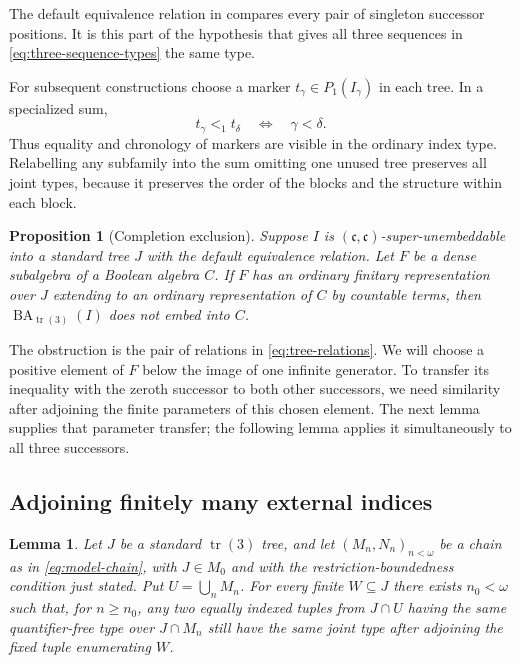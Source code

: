 \documentclass[11pt]{article}
\newtheorem{proposition}[theorem]{Proposition}
\newtheorem{lemma}[theorem]{Lemma}
\theoremstyle{definition}
\theoremstyle{remark}
\newcommand{\BA}{\operatorname{BA}_{\operatorname{tr}(3)}}
\newcommand{\cc}{\mathfrak c}
\newcommand{\tr}{\operatorname{tr}}
\begin{document}
The default equivalence relation in
\cite[Definition~1.4(3)]{Shelah2023} compares every pair of singleton
successor positions.  It is this part of the hypothesis that gives all
three sequences in \eqref{eq:three-sequence-types} the same type.

For subsequent constructions choose a marker
$t_\gamma\in P_1(I_\gamma)$ in each tree.  In a specialized sum,
\begin{equation}\label{eq:marker-order}
 t_\gamma<_1t_\delta\quad\Longleftrightarrow\quad\gamma<\delta.
\end{equation}
Thus equality and chronology of markers are visible in the ordinary index
type.  Relabelling any subfamily into the sum omitting one unused tree
preserves all joint types, because it preserves the order of the blocks
and the structure within each block.

\begin{proposition}[Completion exclusion]\label{prop:exclusion}
Suppose $I$ is $(\cc,\cc)$-super-unembeddable into a standard tree $J$
with the default equivalence relation.  Let $F$ be a dense subalgebra of a
Boolean algebra $C$.  If $F$ has an ordinary finitary representation over
$J$ extending to an ordinary representation of $C$ by countable terms,
then $\BA(I)$ does not embed into $C$.
\end{proposition}

The obstruction is the pair of relations in \eqref{eq:tree-relations}.
We will choose a positive element of $F$ below the image of one infinite
generator.  To transfer its inequality with the zeroth successor to both
other successors, we need similarity after adjoining the finite parameters
of this chosen element.  The next lemma supplies that parameter transfer;
the following lemma applies it simultaneously to all three successors.

\subsection{Adjoining finitely many external indices}

\begin{lemma}\label{lem:external-parameters}
Let $J$ be a standard $\tr(3)$ tree, and let $(M_n,N_n)_{n<\omega}$ be
a chain as in \eqref{eq:model-chain}, with $J\in M_0$ and with the
restriction-boundedness condition just stated.  Put $U=\bigcup_nM_n$.
For every finite $W\subseteq J$ there exists $n_0<\omega$ such that,
for $n\geq n_0$, any two equally indexed tuples from $J\cap U$ having
the same quantifier-free type over $J\cap M_n$ still have the same joint
type after adjoining the fixed tuple enumerating $W$.
\end{lemma}
\end{document}
